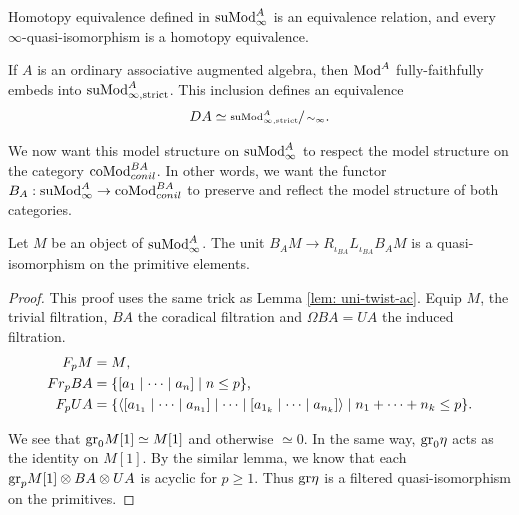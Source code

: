 \documentclass[../thesis.tex]{subfiles}
\begin{document}
            \begin{corollary}
                Homotopy equivalence defined in $\tt{suMod}_\infty^A$ is an equivalence relation, and every $\infty$-quasi-isomorphism is a homotopy equivalence.

                If $A$ is an ordinary associative augmented algebra, then $\tt{Mod}^A$ fully-faithfully embeds into $\tt{suMod}_{\infty, \tt{strict}}^A$. This inclusion defines an equivalence
                \begin{align*}
                    DA \simeq \sfrac{\tt{suMod}^A_{\infty, \tt{strict}}}{\sim_\infty}\tt{.}
                \end{align*}
            \end{corollary}

            We now want this model structure on $\tt{suMod}^A_\infty$ to respect the model structure on the category $\tt{coMod}_{conil}^{BA}$. In other words, we want the functor $B_A: \tt{suMod}_\infty^A \to \tt{coMod}_{conil}^{BA}$ to preserve and reflect the model structure of both categories.

            \begin{lemma}
                Let $M$ be an object of $\tt{suMod}_\infty^A$. The unit $B_AM \to R_{\iota_{BA}}L_{\iota_{BA}}B_AM$ is a quasi-isomorphism on the primitive elements.
            \end{lemma}

            \begin{proof}
                This proof uses the same trick as Lemma \ref{lem: uni-twist-ac}. Equip $M$, the trivial filtration, $BA$ the coradical filtration and $\Omega BA = UA$ the induced filtration.
                \begin{align*}
                    F_pM & = M\tt{,} \\
                    Fr_pBA & = \startset{[a_1 \mid \cdots \mid a_n] \mid n \leq p}\tt{,} \\
                    F_p UA & = \startset{\langle [a_{1_1} \mid \cdots \mid a_{n_1}] \mid \cdots \mid [a_{1_k} \mid \cdots \mid a_{n_k}] \rangle \mid n_1 + \cdots + n_k \leq p}\tt{.}
                \end{align*} 

                We see that $\tt{gr}_0M[1] \simeq M[1]$ and otherwise $\simeq 0$. In the same way, $\tt{gr}_0\eta$ acts as the identity on $M[1]$. By the similar lemma, we know that each $\tt{gr}_p M[1] \otimes BA \otimes UA$ is acyclic for $p \geq 1$. Thus $\tt{gr}\eta$ is a filtered quasi-isomorphism on the primitives.

            \end{proof}
\end{document}
